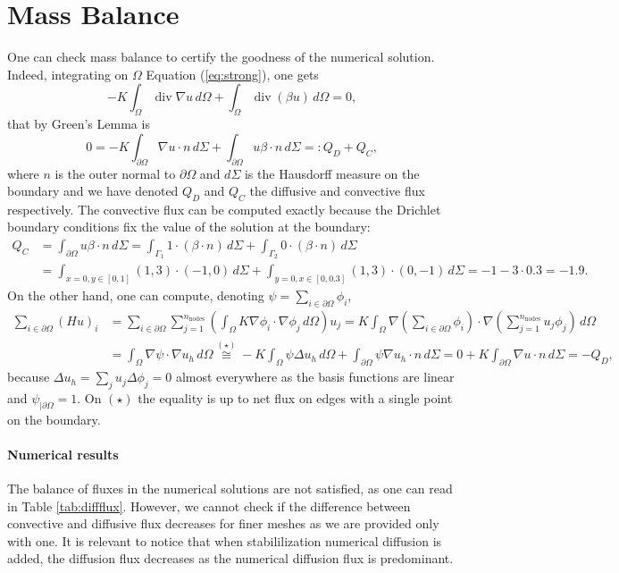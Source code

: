 \documentclass[hidelinks]{article}
\DeclareMathOperator{\divg}{div}
\begin{document}
\section{Mass Balance}
One can check mass balance to certify the goodness of the numerical solution. Indeed, integrating on $\Omega$ Equation (\ref{eq:strong}), one gets 
\[
-K \int_{\Omega}\divg \nabla u \,d\Omega + \int_{\Omega}\divg(\beta u)\,d\Omega = 0,
\]
that by Green's Lemma is 
\[
0 = - K \int_{\partial\Omega} \nabla u \cdot n \,d\Sigma + \int_{\partial\Omega} u \beta\cdot n \,d\Sigma =: Q_D + Q_C,
\]
where $n$ is the outer normal to $\partial\Omega$ and $d\Sigma$ is the Hausdorff measure on the boundary and we have denoted $Q_D$ and $Q_C$ the diffusive and convective flux respectively.
The convective flux can be computed exactly because the Drichlet boundary conditions fix the value of the solution at the boundary:
\begin{align*}
Q_C &= \int_{\partial\Omega} u \beta\cdot n \,d\Sigma = \int_{\Gamma_1} 1 \cdot (\beta\cdot n) \,d\Sigma + \int_{\Gamma_2} 0 \cdot (\beta\cdot n) \,d\Sigma \\
&= \int_{x=0, y \in [0,1]} (1,3) \cdot (-1,0) \,d\Sigma + \int_{y=0, x \in [0,0.3]} (1,3) \cdot (0,-1) \,d\Sigma = -1 - 3 \cdot 0.3 = -1.9.
\end{align*}
On the other hand, one can compute, denoting $\psi = \sum_{i\in \partial\Omega}\phi_i$,
\begin{align*}
    \sum_{i \in \partial\Omega} (Hu)_i &= \sum_{i\in \partial\Omega} \sum_{j=1}^{n_\text{nodes}} \left(\int_\Omega K \nabla \phi_i \cdot \nabla \phi_j\, d\Omega\right)u_j =  K \int_\Omega \nabla\left(\sum_{i\in \partial\Omega}\phi_i\right) \cdot \nabla \left(\sum_{j=1}^{n_\text{nodes}}u_j\phi_j\right)\, d\Omega \\
    &= \int_\Omega \nabla \psi \cdot \nabla u_h \, d\Omega \overset{(\star)}{\cong} - K \int_\Omega \psi \Delta u_h \, d\Omega + \int_{\partial \Omega} \psi \nabla u_h \cdot n \, d\Sigma = 0 +  K \int_{\partial\Omega} \nabla u \cdot n \,d\Sigma = -Q_D,
\end{align*}
because $\Delta u_h = \sum_j u_j \Delta \phi_j = 0$ almost everywhere as the basis functions are linear and $\psi_{| \partial \Omega} = 1$. On $(\star)$ the equality is up to net flux on edges with a single point on the boundary. 

\paragraph{Numerical results}
The balance of fluxes in the numerical solutions are not satisfied, as one can read in Table \ref{tab:diffflux}. However, we cannot check if the difference between convective and diffusive flux decreases for finer meshes as we are provided only with one.
It is relevant to notice that when stabililization numerical diffusion is added, the diffusion flux decreases as the numerical diffusion flux is predominant.
\end{document}
